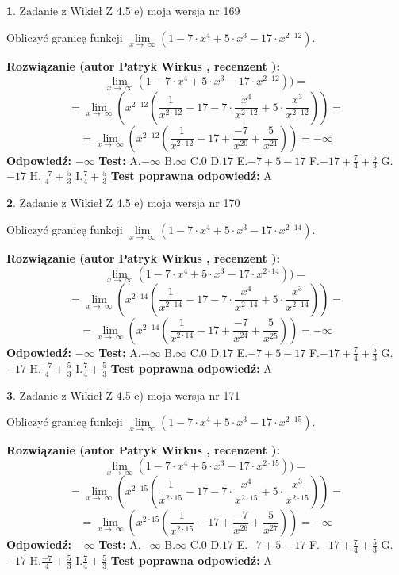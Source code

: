 \documentclass[12pt, a4paper]{article}
\theoremstyle{definition} %
\newtheorem{zad}{}
\newcommand{\zadStart}[1]{\begin{zad}#1\newline}
\newcommand{\zadStop}{\end{zad}}
\newcommand{\rozwStart}[2]{\noindent \textbf{Rozwiązanie (autor #1 , recenzent #2): }\newline}
\newcommand{\rozwStop}{\newline}
\newcommand{\odpStart}{\noindent \textbf{Odpowiedź:}\newline}
\newcommand{\odpStop}{\newline}
\newcommand{\testStart}{\noindent \textbf{Test:}\newline}
\newcommand{\testStop}{\newline}
\newcommand{\kluczStart}{\noindent \textbf{Test poprawna odpowiedź:}\newline}
\newcommand{\kluczStop}{\newline}
\begin{document}
\zadStart{Zadanie z Wikieł Z 4.5 e) moja wersja nr 169}



Obliczyć granicę funkcji  $\lim\limits_{x\to\ \infty}(1 - 7 \cdot x^{4}+5 \cdot x^{3}- 17 \cdot x^{2\cdot12})$.
\zadStop
\rozwStart{Patryk Wirkus}{}
$$\lim\limits_{x\to\ \infty}(1 - 7 \cdot x^{4}+5 \cdot x^{3}- 17 \cdot x^{2\cdot12}))=$$
$$=\lim\limits_{x\to\ \infty}(x^{2\cdot12}(\frac{1}{x^{2\cdot12}}-17 -7 \cdot \frac{x^{4}}{x^{2\cdot12}}+5 \cdot \frac{x^{3}}{x^{2\cdot12}}))=$$
$$=\lim\limits_{x\to\ \infty}(x^{2\cdot12}(\frac{1}{x^{2\cdot12}}-17 + \frac{-7}{x^{20}}+ \frac{5}{x^{21}}))=-\infty$$
\rozwStop
\odpStart
$-\infty$
\odpStop
\testStart
A.$-\infty$ B.$\infty$ C.$0$ D.$17$ E.$-7 + 5 - 17$
F.$-17+\frac{7}{4}+\frac{5}{3}$ G.$-17$
H.$\frac{-7}{4}+\frac{5}{3}$
I.$\frac{7}{4}+\frac{5}{3}$
\testStop
\kluczStart
A
\kluczStop



\zadStart{Zadanie z Wikieł Z 4.5 e) moja wersja nr 170}



Obliczyć granicę funkcji  $\lim\limits_{x\to\ \infty}(1 - 7 \cdot x^{4}+5 \cdot x^{3}- 17 \cdot x^{2\cdot14})$.
\zadStop
\rozwStart{Patryk Wirkus}{}
$$\lim\limits_{x\to\ \infty}(1 - 7 \cdot x^{4}+5 \cdot x^{3}- 17 \cdot x^{2\cdot14}))=$$
$$=\lim\limits_{x\to\ \infty}(x^{2\cdot14}(\frac{1}{x^{2\cdot14}}-17 -7 \cdot \frac{x^{4}}{x^{2\cdot14}}+5 \cdot \frac{x^{3}}{x^{2\cdot14}}))=$$
$$=\lim\limits_{x\to\ \infty}(x^{2\cdot14}(\frac{1}{x^{2\cdot14}}-17 + \frac{-7}{x^{24}}+ \frac{5}{x^{25}}))=-\infty$$
\rozwStop
\odpStart
$-\infty$
\odpStop
\testStart
A.$-\infty$ B.$\infty$ C.$0$ D.$17$ E.$-7 + 5 - 17$
F.$-17+\frac{7}{4}+\frac{5}{3}$ G.$-17$
H.$\frac{-7}{4}+\frac{5}{3}$
I.$\frac{7}{4}+\frac{5}{3}$
\testStop
\kluczStart
A
\kluczStop



\zadStart{Zadanie z Wikieł Z 4.5 e) moja wersja nr 171}



Obliczyć granicę funkcji  $\lim\limits_{x\to\ \infty}(1 - 7 \cdot x^{4}+5 \cdot x^{3}- 17 \cdot x^{2\cdot15})$.
\zadStop
\rozwStart{Patryk Wirkus}{}
$$\lim\limits_{x\to\ \infty}(1 - 7 \cdot x^{4}+5 \cdot x^{3}- 17 \cdot x^{2\cdot15}))=$$
$$=\lim\limits_{x\to\ \infty}(x^{2\cdot15}(\frac{1}{x^{2\cdot15}}-17 -7 \cdot \frac{x^{4}}{x^{2\cdot15}}+5 \cdot \frac{x^{3}}{x^{2\cdot15}}))=$$
$$=\lim\limits_{x\to\ \infty}(x^{2\cdot15}(\frac{1}{x^{2\cdot15}}-17 + \frac{-7}{x^{26}}+ \frac{5}{x^{27}}))=-\infty$$
\rozwStop
\odpStart
$-\infty$
\odpStop
\testStart
A.$-\infty$ B.$\infty$ C.$0$ D.$17$ E.$-7 + 5 - 17$
F.$-17+\frac{7}{4}+\frac{5}{3}$ G.$-17$
H.$\frac{-7}{4}+\frac{5}{3}$
I.$\frac{7}{4}+\frac{5}{3}$
\testStop
\kluczStart
A
\kluczStop
\end{document}
